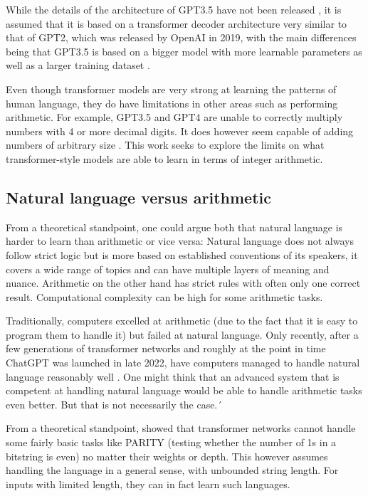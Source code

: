 While the details of the architecture of GPT3.5 have not been released \cite{openai_chatgpt_2022} \cite{openai2023gpt4}, it is assumed that it is based on a transformer decoder architecture very similar to that of GPT2, which was released by OpenAI in 2019, with the main differences being that GPT3.5 is based on a bigger model with more learnable parameters as well as a larger training dataset \cite{OpenGenus2023GPTComparison}.

Even though transformer models are very strong at learning the patterns of human language, they do have limitations in other areas such as performing arithmetic.
For example, GPT3.5 and GPT4 are unable to correctly multiply numbers with 4 or more decimal digits. It does however seem capable of adding numbers of arbitrary size \cite{openai2023gpt4} .  This work seeks to explore the limits on what transformer-style models are able to learn in terms of integer arithmetic.


\subsection{Natural language versus arithmetic}

From a theoretical standpoint, one could argue both that natural language is harder to learn than arithmetic or vice versa:
Natural language does not always follow strict logic but is more based on established conventions of its speakers, it covers a wide range of topics and can have multiple layers of meaning and nuance.
Arithmetic on the other hand has strict rules with often only one correct result. Computational complexity can be high for some arithmetic tasks.

Traditionally, computers excelled at arithmetic (due to the fact that it is easy to program them to handle it) but failed at natural language.
Only recently, after a few generations of transformer networks and roughly at the point in time ChatGPT was launched in late 2022, have computers managed to handle natural language reasonably well \cite{tippingpoint}.
One might think that an advanced system that is competent at handling natural language would be able to handle arithmetic tasks even better. But that is not necessarily the case.´

From a theoretical standpoint, \cite{theoreticallimits} showed that transformer networks cannot handle some fairly basic tasks like PARITY (testing whether the number of 1s in a bitstring is even) no matter their weights or depth. This however assumes handling the language in a general sense, with unbounded string length. For inputs with limited length, they can in fact learn such languages.

